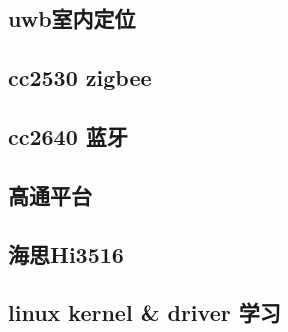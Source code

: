 \documentclass[12pt, a4paper, roman]{moderncv}
\begin{document}
\subsection{uwb室内定位}

\subsection{cc2530 zigbee}

\subsection{cc2640 蓝牙}

\subsection{高通平台}

\subsection{海思Hi3516 }

\subsection{linux kernel & driver 学习}
\end{document}
